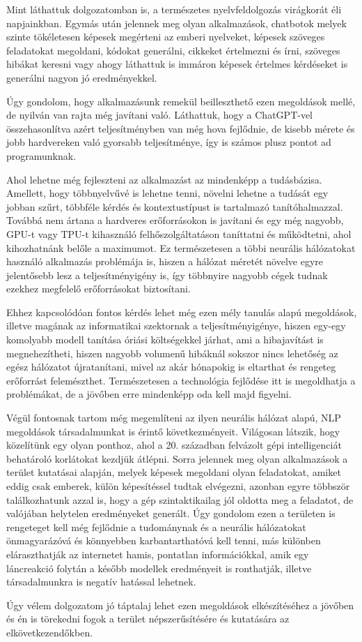 \documentclass[12pt,a4paper]{report}
\begin{document}

Mint láthattuk dolgozatomban is, a természetes nyelvfeldolgozás virágkorát éli napjainkban. Egymás után jelennek meg olyan alkalmazások, chatbotok melyek szinte tökéletesen képesek megérteni az emberi nyelveket, képesek szöveges feladatokat megoldani, kódokat generálni, cikkeket értelmezni és írni, szöveges hibákat keresni vagy ahogy láthattuk is immáron képesek értelmes kérdéseket is generálni nagyon jó eredményekkel. 

Úgy gondolom, hogy alkalmazásunk remekül beilleszthető ezen megoldások mellé, de nyilván van rajta még javítani való. Láthattuk, hogy a ChatGPT-vel összehasonlítva azért teljesítményben van még hova fejlődnie, de kisebb mérete és jobb hardvereken való gyorsabb teljesítménye, így is számos plusz pontot ad programunknak.

Ahol lehetne még fejleszteni az alkalmazást az mindenképp a tudásbázisa. Amellett, hogy többnyelvűvé is lehetne tenni, növelni lehetne a tudását egy jobban szűrt, többféle kérdés és kontextustípust is tartalmazó tanítóhalmazzal. Továbbá nem ártana a hardveres erőforrásokon is javítani és egy még nagyobb, GPU-t vagy TPU-t kihasználó felhőszolgáltatáson taníttatni és működtetni, ahol kihozhatnánk belőle a maximumot. Ez természetesen a többi neurális hálózatokat használó alkalmazás problémája is, hiszen a hálózat méretét növelve egyre jelentősebb lesz a teljesítményigény is, így többnyire nagyobb cégek tudnak ezekhez megfelelő erőforrásokat biztosítani.

Ehhez kapcsolódóan fontos kérdés lehet még ezen mély tanulás alapú megoldások, illetve magának az informatikai szektornak a teljesítményigénye, hiszen egy-egy komolyabb modell tanítása óriási költségekkel járhat, ami a hibajavítást is megnehezítheti, hiszen nagyobb volumenű hibáknál sokszor nincs lehetőség az egész hálózatot újratanítani, mivel az akár hónapokig is eltarthat és rengeteg erőforrást felemészthet. Természetesen a technológia fejlődése itt is megoldhatja a problémákat, de a jövőben erre mindenképp oda kell majd figyelni.

Végül fontosnak tartom még megemlíteni az ilyen neurális hálózat alapú, NLP megoldások társadalmunkat is érintő következményeit. Világosan látszik, hogy közelítünk egy olyan ponthoz, ahol a 20. században felvázolt gépi intelligenciát behatároló korlátokat kezdjük átlépni. Sorra jelennek meg olyan alkalmazások a terület kutatásai alapján, melyek képesek megoldani olyan feladatokat, amiket eddig csak emberek, külön képesítéssel tudtak elvégezni, azonban egyre többször találkozhatunk azzal is, hogy a gép szintaktikailag jól oldotta meg a feladatot, de valójában helytelen eredményeket generált. Úgy gondolom ezen a területen is rengeteget kell még fejlődnie a tudománynak és a neurális hálózatokat önmagyarázóvá és könnyebben karbantarthatóvá kell tenni, más különben eláraszthatják az internetet hamis, pontatlan információkkal, amik egy láncreakció folytán a később modellek eredményeit is ronthatják, illetve társadalmunkra is negatív hatással lehetnek.

Úgy vélem dolgozatom jó táptalaj lehet ezen megoldások elkészítéséhez a jövőben és én is törekedni fogok a terület népszerűsítésére és kutatására az elkövetkezendőkben.
\end{document}
